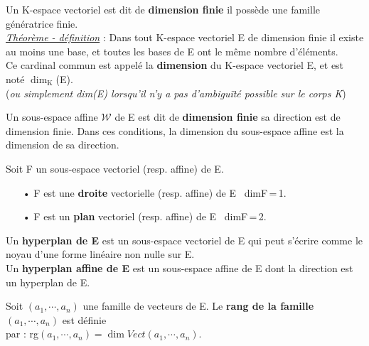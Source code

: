 \vspace{1.6cm}

Un K-espace vectoriel est dit de \textbf{dimension finie} \ssi il possède une famille\\
génératrice finie.\vspace{0.1cm} \\
\hspace*{0.5cm} \underline{\emph{Théorème - définition}} : Dans tout K-espace vectoriel E de dimension finie il existe au moins une base, et toutes les bases de E ont le même nombre d'éléments.\\
Ce cardinal commun est appelé la \textbf{dimension} du K-espace vectoriel E, et est noté \(\dim_\text{K}\)(E).\\ (\emph{ou simplement dim(E) lorsqu'il n'y a pas d'ambiguïté possible sur le corps K})

\vspace{.3cm}

Un sous-espace affine \(\mathcal{W}\) de E est dit de \textbf{dimension finie} \ssi sa direction est de dimension finie. Dans ces conditions, la dimension du sous-espace affine est la dimension de sa direction.

\newpage

\noindent Soit F un sous-espace vectoriel (resp. affine) de E.\vspace{-0.1cm}
\begin{itemize}[leftmargin=1cm]
    \item[•] F est une \textbf{droite} vectorielle (resp. affine) de E \ssi \, dimF\,=\,1.

    \item[•] F est un \textbf{plan} vectoriel (resp. affine) de E \ssi\, dimF\,=\,2.
\end{itemize}

\vspace{0.8cm}

Un \textbf{hyperplan de E} est un sous-espace vectoriel de E qui peut s'écrire comme le noyau d'une forme linéaire non nulle sur E.\\
Un \textbf{hyperplan affine de E} est un sous-espace affine de E dont la direction est un hyperplan de E.

\vspace{1cm}

Soit \((a_1,\cdots,a_n)\) une famille de vecteurs de E. Le \textbf{rang de la famille} \((a_1,\cdots,a_n)\) est définie\\
par : rg\((a_1,\cdots,a_n)=\dim Vect(a_1,\cdots,a_n)\).\vspace{0.5cm}


